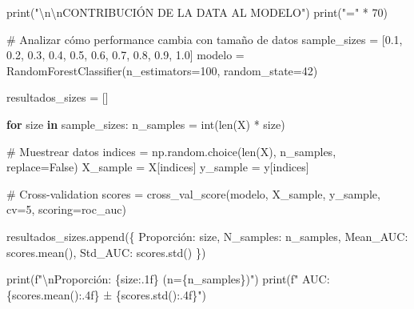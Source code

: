 \documentclass[
  doc,
  floatsintext,
  longtable,
  a4paper,
  nolmodern,
  notxfonts,
  notimes,
  12pt,
  colorlinks=true,linkcolor=blue,citecolor=blue,urlcolor=blue]{apa7}
\newenvironment{Shaded}{\begin{snugshade}}{\end{snugshade}}
\newcommand{\BuiltInTok}[1]{\textcolor[rgb]{0.00,0.23,0.31}{#1}}
\newcommand{\CharTok}[1]{\textcolor[rgb]{0.13,0.47,0.30}{#1}}
\newcommand{\CommentTok}[1]{\textcolor[rgb]{0.37,0.37,0.37}{#1}}
\newcommand{\ControlFlowTok}[1]{\textcolor[rgb]{0.00,0.23,0.31}{\textbf{#1}}}
\newcommand{\DecValTok}[1]{\textcolor[rgb]{0.68,0.00,0.00}{#1}}
\newcommand{\FloatTok}[1]{\textcolor[rgb]{0.68,0.00,0.00}{#1}}
\newcommand{\KeywordTok}[1]{\textcolor[rgb]{0.00,0.23,0.31}{\textbf{#1}}}
\newcommand{\NormalTok}[1]{\textcolor[rgb]{0.00,0.23,0.31}{#1}}
\newcommand{\OperatorTok}[1]{\textcolor[rgb]{0.37,0.37,0.37}{#1}}
\newcommand{\SpecialCharTok}[1]{\textcolor[rgb]{0.37,0.37,0.37}{#1}}
\newcommand{\SpecialStringTok}[1]{\textcolor[rgb]{0.13,0.47,0.30}{#1}}
\newcommand{\StringTok}[1]{\textcolor[rgb]{0.13,0.47,0.30}{#1}}
\newcommand{\VariableTok}[1]{\textcolor[rgb]{0.07,0.07,0.07}{#1}}
\begin{document}
\begin{Shaded}
\begin{Highlighting}[]
\BuiltInTok{print}\NormalTok{(}\StringTok{"}\CharTok{\textbackslash{}n\textbackslash{}n}\StringTok{CONTRIBUCIÓN DE LA DATA AL MODELO"}\NormalTok{)}
\BuiltInTok{print}\NormalTok{(}\StringTok{"="} \OperatorTok{*} \DecValTok{70}\NormalTok{)}

\CommentTok{\# Analizar cómo performance cambia con tamaño de datos}
\NormalTok{sample\_sizes }\OperatorTok{=}\NormalTok{ [}\FloatTok{0.1}\NormalTok{, }\FloatTok{0.2}\NormalTok{, }\FloatTok{0.3}\NormalTok{, }\FloatTok{0.4}\NormalTok{, }\FloatTok{0.5}\NormalTok{, }\FloatTok{0.6}\NormalTok{, }\FloatTok{0.7}\NormalTok{, }\FloatTok{0.8}\NormalTok{, }\FloatTok{0.9}\NormalTok{, }\FloatTok{1.0}\NormalTok{]}
\NormalTok{modelo }\OperatorTok{=}\NormalTok{ RandomForestClassifier(n\_estimators}\OperatorTok{=}\DecValTok{100}\NormalTok{, random\_state}\OperatorTok{=}\DecValTok{42}\NormalTok{)}

\NormalTok{resultados\_sizes }\OperatorTok{=}\NormalTok{ []}

\ControlFlowTok{for}\NormalTok{ size }\KeywordTok{in}\NormalTok{ sample\_sizes:}
\NormalTok{    n\_samples }\OperatorTok{=} \BuiltInTok{int}\NormalTok{(}\BuiltInTok{len}\NormalTok{(X) }\OperatorTok{*}\NormalTok{ size)}
    
    \CommentTok{\# Muestrear datos}
\NormalTok{    indices }\OperatorTok{=}\NormalTok{ np.random.choice(}\BuiltInTok{len}\NormalTok{(X), n\_samples, replace}\OperatorTok{=}\VariableTok{False}\NormalTok{)}
\NormalTok{    X\_sample }\OperatorTok{=}\NormalTok{ X[indices]}
\NormalTok{    y\_sample }\OperatorTok{=}\NormalTok{ y[indices]}
    
    \CommentTok{\# Cross{-}validation}
\NormalTok{    scores }\OperatorTok{=}\NormalTok{ cross\_val\_score(modelo, X\_sample, y\_sample, cv}\OperatorTok{=}\DecValTok{5}\NormalTok{, scoring}\OperatorTok{=}\StringTok{\textquotesingle{}roc\_auc\textquotesingle{}}\NormalTok{)}
    
\NormalTok{    resultados\_sizes.append(\{}
        \StringTok{\textquotesingle{}Proporción\textquotesingle{}}\NormalTok{: size,}
        \StringTok{\textquotesingle{}N\_samples\textquotesingle{}}\NormalTok{: n\_samples,}
        \StringTok{\textquotesingle{}Mean\_AUC\textquotesingle{}}\NormalTok{: scores.mean(),}
        \StringTok{\textquotesingle{}Std\_AUC\textquotesingle{}}\NormalTok{: scores.std()}
\NormalTok{    \})}
    
    \BuiltInTok{print}\NormalTok{(}\SpecialStringTok{f"}\CharTok{\textbackslash{}n}\SpecialStringTok{Proporción: }\SpecialCharTok{\{}\NormalTok{size}\SpecialCharTok{:.1f\}}\SpecialStringTok{ (n=}\SpecialCharTok{\{}\NormalTok{n\_samples}\SpecialCharTok{\}}\SpecialStringTok{)"}\NormalTok{)}
    \BuiltInTok{print}\NormalTok{(}\SpecialStringTok{f"  AUC: }\SpecialCharTok{\{}\NormalTok{scores}\SpecialCharTok{.}\NormalTok{mean()}\SpecialCharTok{:.4f\}}\SpecialStringTok{ ± }\SpecialCharTok{\{}\NormalTok{scores}\SpecialCharTok{.}\NormalTok{std()}\SpecialCharTok{:.4f\}}\SpecialStringTok{"}\NormalTok{)}


\end{Highlighting}
\end{Shaded}
\end{document}
